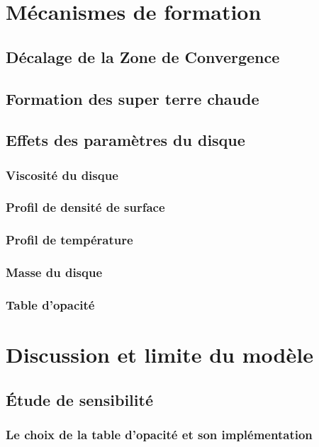 \documentclass[a4paper,twoside]{report}
\begin{document}
\chapter{Mécanismes de formation}
\section{Décalage de la Zone de Convergence}
\section{Formation des super terre chaude}
\section{Effets des paramètres du disque}
\subsection{Viscosité du disque}
\subsection{Profil de densité de surface}
\subsection{Profil de température}
\subsection{Masse du disque}
\subsection{Table d'opacité}

\chapter{Discussion et limite du modèle}\label{sec:discussion}
\section{Étude de sensibilité}
\subsection{Le choix de la table d'opacité et son implémentation}
\end{document}

